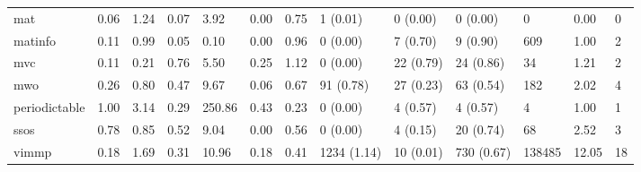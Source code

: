\begin{table}
\begin{tabular}{m{3.5cm}m{2cm}m{2cm}m{2cm}m{2cm}m{2cm}m{2cm}m{2cm}m{2cm}m{2cm}m{2cm}m{2cm}m{2cm}}
mat                     &                0.06 &                  1.24 &                   0.07 &               3.92 &               0.00 &                  0.75 &       1 (0.01) &    0 (0.00) &     0 (0.00) &               0 &     0.00 &          0 \\
matinfo                 &                0.11 &                  0.99 &                   0.05 &               0.10 &               0.00 &                  0.96 &       0 (0.00) &    7 (0.70) &     9 (0.90) &             609 &     1.00 &          2 \\
mvc                     &                0.11 &                  0.21 &                   0.76 &               5.50 &               0.25 &                  1.12 &       0 (0.00) &   22 (0.79) &    24 (0.86) &              34 &     1.21 &          2 \\
mwo                     &                0.26 &                  0.80 &                   0.47 &               9.67 &               0.06 &                  0.67 &      91 (0.78) &   27 (0.23) &    63 (0.54) &             182 &     2.02 &          4 \\
periodictable           &                1.00 &                  3.14 &                   0.29 &             250.86 &               0.43 &                  0.23 &       0 (0.00) &    4 (0.57) &     4 (0.57) &               4 &     1.00 &          1 \\
ssos                    &                0.78 &                  0.85 &                   0.52 &               9.04 &               0.00 &                  0.56 &       0 (0.00) &    4 (0.15) &    20 (0.74) &              68 &     2.52 &          3 \\
vimmp                   &                0.18 &                  1.69 &                   0.31 &              10.96 &               0.18 &                  0.41 &    1234 (1.14) &   10 (0.01) &   730 (0.67) &          138485 &    12.05 &         18 \\
\bottomrule
\end{tabular}
\end{table}
